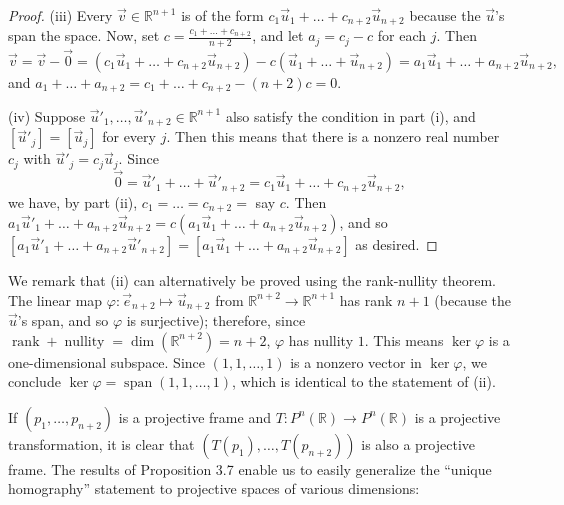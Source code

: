 \documentclass[leqno]{book}
\begin{document}
\begin{proof}
(iii) Every $\vec v\in\mathbb R^{n+1}$ is of the form $c_1\vec u_1+\dots+c_{n+2}\vec u_{n+2}$ because the $\vec u$'s span the space.  Now, set $c=\frac{c_1+\dots+c_{n+2}}{n+2}$, and let $a_j=c_j-c$ for each $j$.  Then
$$\vec v=\vec v-\vec 0=(c_1\vec u_1+\dots+c_{n+2}\vec u_{n+2})-c(\vec u_1+\dots+\vec u_{n+2})=a_1\vec u_1+\dots+a_{n+2}\vec u_{n+2},$$
and $a_1+\dots+a_{n+2}=c_1+\dots+c_{n+2}-(n+2)c=0$.

(iv) Suppose $\vec u'_1,\dots,\vec u'_{n+2}\in\mathbb R^{n+1}$ also satisfy the condition in part (i), and $[\vec u'_j]=[\vec u_j]$ for every $j$.  Then this means that there is a nonzero real number $c_j$ with $\vec u'_j=c_j\vec u_j$.  Since
$$\vec 0=\vec u'_1+\dots+\vec u'_{n+2}=c_1\vec u_1+\dots+c_{n+2}\vec u_{n+2},$$
we have, by part (ii), $c_1=\dots=c_{n+2}=$ say $c$.  Then $a_1\vec u'_1+\dots+a_{n+2}\vec u_{n+2}=c(a_1\vec u_1+\dots+a_{n+2}\vec u_{n+2})$, and so $[a_1\vec u'_1+\dots+a_{n+2}\vec u'_{n+2}]=[a_1\vec u_1+\dots+a_{n+2}\vec u_{n+2}]$ as desired.
\end{proof}

\noindent We remark that (ii) can alternatively be proved using the rank-nullity theorem.  The linear map $\varphi:\vec e_{n+2}\mapsto\vec u_{n+2}$ from $\mathbb R^{n+2}\to\mathbb R^{n+1}$ has rank $n+1$ (because the $\vec u$'s span, and so $\varphi$ is surjective); therefore, since $\operatorname{rank}+\operatorname{nullity}=\dim(\mathbb R^{n+2})=n+2$, $\varphi$ has nullity $1$.  This means $\ker\varphi$ is a one-dimensional subspace.  Since $(1,1,\dots,1)$ is a nonzero vector in $\ker\varphi$, we conclude $\ker\varphi=\operatorname{span}(1,1,\dots,1)$, which is identical to the statement of (ii).

If $(p_1,\dots,p_{n+2})$ is a projective frame and $T:P^n(\mathbb R)\to P^n(\mathbb R)$ is a projective transformation, it is clear that $(T(p_1),\dots,T(p_{n+2}))$ is also a projective frame.  The results of Proposition 3.7 enable us to easily generalize the ``unique homography'' statement to projective spaces of various dimensions:\\
\end{document}
